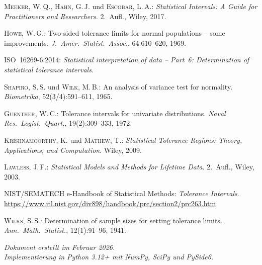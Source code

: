 \documentclass[10pt,a4paper,twocolumn]{article}
\theoremstyle{definition}
\begin{document}
\begin{enumerate}[nosep,leftmargin=*,label={[\arabic*]}]
    \item \textsc{Meeker}, W.\,Q., \textsc{Hahn}, G.\,J. und
          \textsc{Escobar}, L.\,A.:
          \emph{Statistical Intervals: A Guide for Practitioners
          and Researchers}. 2.~Aufl., Wiley, 2017.

    \item \textsc{Howe}, W.\,G.:
          Two-sided tolerance limits for normal populations --
          some improvements.
          \emph{J.\ Amer.\ Statist.\ Assoc.}, 64:610--620, 1969.

    \item ISO~16269-6:2014:
          \emph{Statistical interpretation of data -- Part~6:
          Determination of statistical tolerance intervals}.

    \item \textsc{Shapiro}, S.\,S. und \textsc{Wilk}, M.\,B.:
          An analysis of variance test for normality.
          \emph{Biometrika}, 52(3/4):591--611, 1965.

    \item \textsc{Guenther}, W.\,C.:
          Tolerance intervals for univariate distributions.
          \emph{Naval Res.\ Logist.\ Quart.}, 19(2):309--333, 1972.

    \item \textsc{Krishnamoorthy}, K. und \textsc{Mathew}, T.:
          \emph{Statistical Tolerance Regions: Theory, Applications,
          and Computation}. Wiley, 2009.

    \item \textsc{Lawless}, J.\,F.:
          \emph{Statistical Models and Methods for Lifetime Data}.
          2.~Aufl., Wiley, 2003.

    \item NIST/SEMATECH e-Handbook of Statistical Methods:
          \emph{Tolerance Intervals}.
          \url{https://www.itl.nist.gov/div898/handbook/prc/section2/prc263.htm}

    \item \textsc{Wilks}, S.\,S.:
          Determination of sample sizes for setting tolerance limits.
          \emph{Ann.\ Math.\ Statist.}, 12(1):91--96, 1941.
\end{enumerate}

\vfill

\begin{center}
\small\textit{Dokument erstellt im Februar 2026.\\
Implementierung in Python 3.12+ mit NumPy, SciPy und PySide6.}
\end{center}
\end{document}
